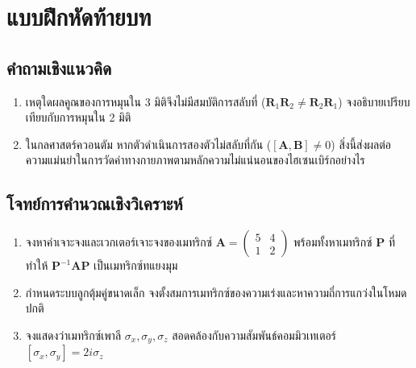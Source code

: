 \clearpage
\section{แบบฝึกหัดท้ายบท}
\subsection{คำถามเชิงแนวคิด}
\begin{enumerate}
    \item เหตุใดผลคูณของการหมุนใน 3 มิติจึงไม่มีสมบัติการสลับที่ ($\mathbf{R}_1 \mathbf{R}_2 \neq \mathbf{R}_2 \mathbf{R}_1$) จงอธิบายเปรียบเทียบกับการหมุนใน 2 มิติ
    \item ในกลศาสตร์ควอนตัม หากตัวดำเนินการสองตัวไม่สลับที่กัน ($[\mathbf{A}, \mathbf{B}] \neq 0$) สิ่งนี้ส่งผลต่อความแม่นยำในการวัดค่าทางกายภาพตามหลักความไม่แน่นอนของไฮเซนเบิร์กอย่างไร
\end{enumerate}

\subsection{โจทย์การคำนวณเชิงวิเคราะห์}
\begin{enumerate}
    \item จงหาค่าเจาะจงและเวกเตอร์เจาะจงของเมทริกซ์ $\mathbf{A} = \begin{pmatrix} 5 & 4 \\ 1 & 2 \end{pmatrix}$ พร้อมทั้งหาเมทริกซ์ $\mathbf{P}$ ที่ทำให้ $\mathbf{P}^{-1} \mathbf{A} \mathbf{P}$ เป็นเมทริกซ์ทแยงมุม
    \item กำหนดระบบลูกตุ้มคู่ขนาดเล็ก จงตั้งสมการเมทริกซ์ของความเร่งและหาความถี่การแกว่งในโหมดปกติ
    \item จงแสดงว่าเมทริกซ์เพาลี $\sigma_x, \sigma_y, \sigma_z$ สอดคล้องกับความสัมพันธ์คอมมิวเทเตอร์ $[\sigma_x, \sigma_y] = 2i\sigma_z$
\end{enumerate}
